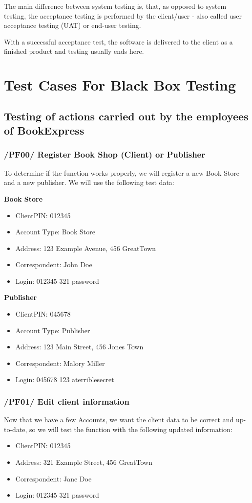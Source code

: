 \documentclass[11pt,a4paper,oneside,svgnames]{report}
\begin{document}
The main difference between system testing is, that, as opposed to system testing, the acceptance testing is performed by the client/user - also called user acceptance testing (UAT) or end-user testing.

With a successful acceptance test, the software is delivered to the client as a finished product and testing usually ends here.

\chapter{Test Cases For Black Box Testing}
\section{Testing of actions carried out by the employees of BookExpress}
\subsection{/PF00/ Register Book Shop (Client) or Publisher}
To determine if the function works properly, we will register a new Book Store and a new publisher. 
We will use the following test data:
 
\begin{center}
\label{client1}
\textbf{Book Store}
\begin{itemize}
\item{ClientPIN: 012345}
\item{Account Type: Book Store}
\item{Address: 123 Example Avenue, 456 GreatTown}
\item{Correspondent: John Doe}
\item{Login: 012345 321 password}
\end{itemize}
\label{publisher1}
\textbf{Publisher}
\begin{itemize}
\item{ClientPIN: 045678}
\item{Account Type: Publisher}
\item{Address: 123 Main Street, 456 Jones Town}
\item{Correspondent: Malory Miller}
\item{Login: 045678 123 aterriblesecret}
\end{itemize}
\end{center}
\subsection{/PF01/ Edit client information}
Now that we have a few Accounts, we want the client data to be correct and up-to-date, so we will test the function with the following updated information:
\begin{itemize}
\item{ClientPIN: 012345}
\item{Address: 321 Example Street, 456 GreatTown}
\item{Correspondent: Jane Doe}
\item{Login: 012345 321 password}
\end{itemize}
\end{document}
